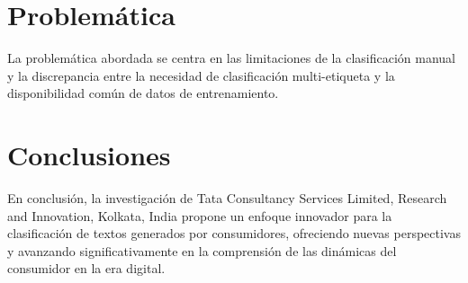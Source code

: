 \documentclass[12pt]{article}
\begin{document}
\section{Problemática}
La problemática abordada se centra en las limitaciones de la clasificación manual y la discrepancia entre la necesidad de clasificación multi-etiqueta y la disponibilidad común de datos de entrenamiento.

\section{Conclusiones}
En conclusión, la investigación de Tata Consultancy Services Limited, Research and Innovation, Kolkata, India propone un enfoque innovador para la clasificación de textos generados por consumidores, ofreciendo nuevas perspectivas y avanzando significativamente en la comprensión de las dinámicas del consumidor en la era digital.
\end{document}
